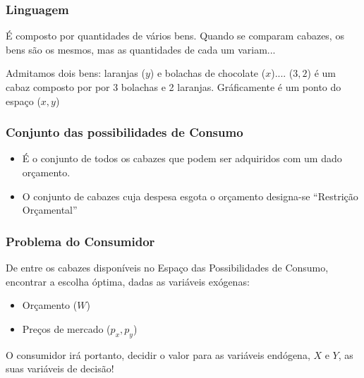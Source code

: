 \begin{frame}
	\frametitle{Linguagem}
		\begin{tcolorbox}[colback=blue!5,colframe=blue!40!black,title=Cabaz de Bens]
		\'E composto por quantidades de v\'arios bens. Quando se comparam cabazes, os bens s\~ao os mesmos, mas as quantidades de cada um variam...
	\end{tcolorbox}\pause

	Admitamos dois bens: laranjas ($y$) e bolachas de chocolate ($x$).... ($3,2$) \'e um cabaz composto por por 3 bolachas e 2 laranjas. Gr\'aficamente \'e um ponto do espa\c co ($x,y$)
\end{frame}

\begin{frame}
	\begin{center}
	\end{center}
\end{frame}

\begin{frame}
	\frametitle{Conjunto das possibilidades de Consumo}

	\begin{itemize}
		\item \'E o conjunto de todos os cabazes que podem ser adquiridos com um dado or\c camento.
		\item O conjunto de cabazes cuja despesa esgota o or\c camento designa-se ``Restri\c c\~ao Or\c camental''
	\end{itemize}

\end{frame}

\begin{frame}
	\frametitle{Problema do Consumidor}
	De entre os cabazes dispon\'iveis no Espa\c co das Possibilidades de Consumo, encontrar a escolha \'optima, dadas as vari\'aveis ex\'ogenas:\pause

	\vspace{0.2cm}

	\begin{itemize}
		\item Or\c camento ($W$)\pause
		\item Pre\c cos de mercado ($p_x,p_y$)\pause
	\end{itemize}
	\vspace{0.4cm}

	O consumidor ir\'a portanto, decidir o valor para as vari\'aveis end\'ogena, $X$ e $Y$, as suas vari\'aveis de decis\~ao!
\end{frame}

